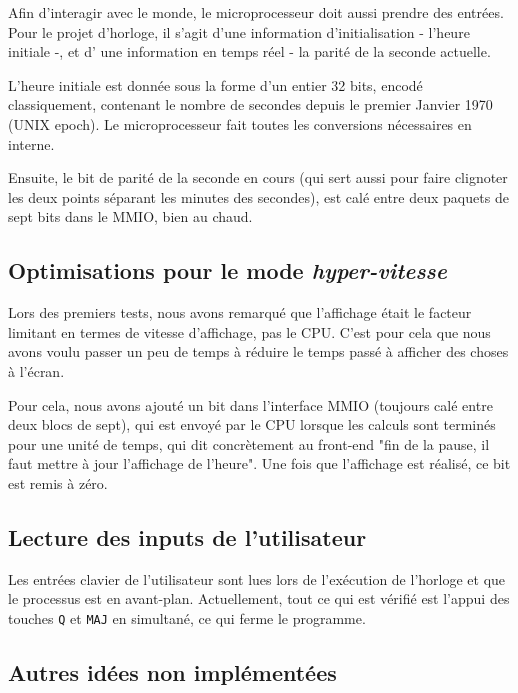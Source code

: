 \documentclass[10pt,a4paper,notitlepage ]{article}
\begin{document}
	Afin d'interagir avec le monde, le microprocesseur doit aussi prendre des entrées. Pour le projet d'horloge, il s'agit d'une information d'initialisation - l'heure initiale -, et d' une information en temps réel - la parité de la seconde actuelle.
	
	L'heure initiale est donnée sous la forme d'un entier 32 bits, encodé classiquement, contenant le nombre de secondes depuis le premier Janvier 1970 (UNIX epoch). Le microprocesseur fait toutes les conversions nécessaires en interne.
	
	Ensuite, le bit de parité de la seconde en cours (qui sert aussi pour faire clignoter les deux points séparant les minutes des secondes), est calé entre deux paquets de sept bits dans le MMIO, bien au chaud.
	
	\subsection{Optimisations pour le mode \textit{hyper-vitesse}}
	
	Lors des premiers tests, nous avons remarqué que l'affichage était le facteur limitant en termes de vitesse d'affichage, pas le CPU. C'est pour cela que nous avons voulu passer un peu de temps à réduire le temps passé à afficher des choses à l'écran.
	
	Pour cela, nous avons ajouté un bit dans l'interface MMIO (toujours calé entre deux blocs de sept), qui est envoyé par le CPU lorsque les calculs sont terminés pour une unité de temps, qui dit concrètement au front-end "fin de la pause, il faut mettre à jour l'affichage de l'heure". Une fois que l'affichage est réalisé, ce bit est remis à zéro.
	
	\subsection{Lecture des inputs de l'utilisateur}
	
	Les entrées clavier de l'utilisateur sont lues lors de l'exécution de l'horloge et que le processus est en avant-plan. Actuellement, tout ce qui est vérifié est l'appui des touches \texttt{Q} et \texttt{MAJ} en simultané, ce qui ferme le programme.
	
	\subsection{Autres idées non implémentées}
	
\end{document}
